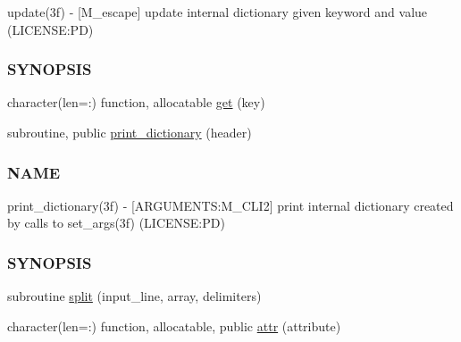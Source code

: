 \begin{DoxyCompactItemize}
\begin{DoxyCompactList}
update(3f) -\/ \mbox{[}M\+\_\+escape\mbox{]} update internal dictionary given keyword and value (L\+I\+C\+E\+N\+SE\+:PD) \subsubsection*{S\+Y\+N\+O\+P\+S\+IS}\end{DoxyCompactList}\item 
character(len=\+:) function, allocatable \mbox{\hyperlink{namespacem__escape_af555c90c278ff964d8bce93ee0368a42}{get}} (key)
\item 
subroutine, public \mbox{\hyperlink{namespacem__escape_a6add907828fd34e94b87f643a5cabc64}{print\+\_\+dictionary}} (header)
\begin{DoxyCompactList}\small\item\em \subsubsection*{N\+A\+ME}

print\+\_\+dictionary(3f) -\/ \mbox{[}A\+R\+G\+U\+M\+E\+N\+TS\+:M\+\_\+\+C\+L\+I2\mbox{]} print internal dictionary created by calls to set\+\_\+args(3f) (L\+I\+C\+E\+N\+SE\+:PD) \subsubsection*{S\+Y\+N\+O\+P\+S\+IS}\end{DoxyCompactList}\item 
subroutine \mbox{\hyperlink{namespacem__escape_af23bd97702864e0f32258e6ec0d51506}{split}} (input\+\_\+line, array, delimiters)
\item 
character(len=\+:) function, allocatable, public \mbox{\hyperlink{namespacem__escape_ab9ee8dee0ee167567e9c2f570f398987}{attr}} (attribute)
\end{DoxyCompactItemize}
